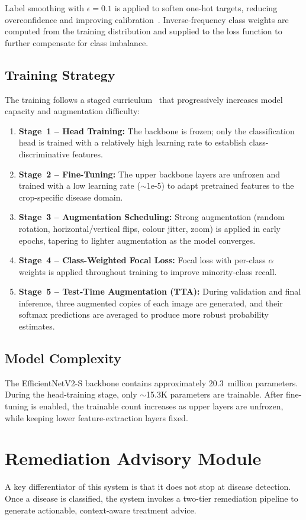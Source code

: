 \documentclass[12pt,a4paper]{report}
\begin{document}
Label smoothing with $\epsilon = 0.1$ is applied to soften one-hot targets, reducing overconfidence and improving calibration~\cite{b18}. Inverse-frequency class weights are computed from the training distribution and supplied to the loss function to further compensate for class imbalance.

\subsection{Training Strategy}
The training follows a staged curriculum~\cite{b23} that progressively increases model capacity and augmentation difficulty:

\begin{enumerate}
    \item \textbf{Stage~1 -- Head Training:} The backbone is frozen; only the classification head is trained with a relatively high learning rate to establish class-discriminative features.
    \item \textbf{Stage~2 -- Fine-Tuning:} The upper backbone layers are unfrozen and trained with a low learning rate ($\sim$1e-5) to adapt pretrained features to the crop-specific disease domain.
    \item \textbf{Stage~3 -- Augmentation Scheduling:} Strong augmentation (random rotation, horizontal/vertical flips, colour jitter, zoom) is applied in early epochs, tapering to lighter augmentation as the model converges.
    \item \textbf{Stage~4 -- Class-Weighted Focal Loss:} Focal loss with per-class $\alpha$ weights is applied throughout training to improve minority-class recall.
    \item \textbf{Stage~5 -- Test-Time Augmentation (TTA):} During validation and final inference, three augmented copies of each image are generated, and their softmax predictions are averaged to produce more robust probability estimates.
\end{enumerate}

\subsection{Model Complexity}
The EfficientNetV2-S backbone contains approximately 20.3~million parameters. During the head-training stage, only $\sim$15.3K parameters are trainable. After fine-tuning is enabled, the trainable count increases as upper layers are unfrozen, while keeping lower feature-extraction layers fixed.

\section{Remediation Advisory Module}
A key differentiator of this system is that it does not stop at disease detection. Once a disease is classified, the system invokes a two-tier remediation pipeline to generate actionable, context-aware treatment advice.
\end{document}
